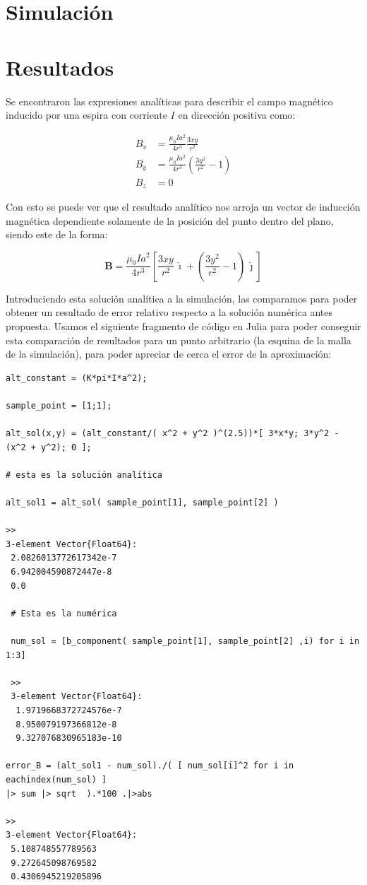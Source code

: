 \documentclass{article}
\def\ii{\, \hat{\imath}  }
\def\jj{\, \hat{\jmath}  }
\begin{document}
\section{Simulación}

\section{Resultados}

Se encontraron las expresiones analíticas para describir el campo magnético inducido por una espira con corriente \(I\) en
dirección positiva como:

\begin{align}
	B_x & = \frac{\mu_0 I a^2}{4 r^3} \frac{3 xy}{r^2}                    \\
	B_y & = \frac{\mu_0 I a^2}{4 r^3} \left( \frac{3 y^2}{r^2} -1 \right) \\
	B_z & = 0
\end{align}

Con esto se puede ver que el resultado analítico nos arroja un vector de inducción magnética dependiente solamente de la
posición del punto dentro del plano, siendo este de la forma:

\begin{equation}
	\mathbf{B} = \frac{\mu_0 I a^2}{4 r^3} \left[ \frac{3xy}{r^2} \ii + \left( \frac{3 y^2}{r^2} -1 \right) \jj \right]
\end{equation}

Introduciendo esta solución analítica a la simulación, las comparamos para poder obtener un resultado de error relativo
respecto a la solución numérica antes propuesta. Usamos el siguiente fragmento de código en Julia para poder conseguir
esta comparación de resultados para un punto arbitrario (la esquina de la malla de la simulación), para poder apreciar
de cerca el error de la aproximación:

\begin{verbatim}
alt_constant = (K*pi*I*a^2);

sample_point = [1;1];

alt_sol(x,y) = (alt_constant/( x^2 + y^2 )^(2.5))*[ 3*x*y; 3*y^2 - (x^2 + y^2); 0 ];

# esta es la solución analítica

alt_sol1 = alt_sol( sample_point[1], sample_point[2] )

>>
3-element Vector{Float64}:
 2.0826013772617342e-7
 6.942004590872447e-8
 0.0

 # Esta es la numérica

 num_sol = [b_component( sample_point[1], sample_point[2] ,i) for i in 1:3]

 >>
 3-element Vector{Float64}:
  1.9719668372724576e-7
  8.950079197366812e-8
  9.327076830965183e-10

error_B = (alt_sol1 - num_sol)./( [ num_sol[i]^2 for i in eachindex(num_sol) ]
|> sum |> sqrt  ).*100 .|>abs

>>
3-element Vector{Float64}:
 5.108748557789563
 9.272645098769582
 0.4306945219205896

\end{verbatim}
\end{document}
